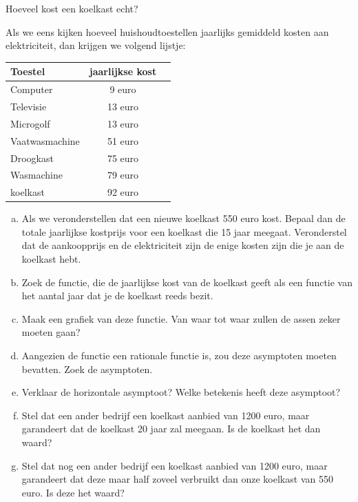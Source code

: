 \documentclass[12pt]{article}
\begin{document}
\begin{oefening}
Hoeveel kost een koelkast echt?

Als we eens kijken hoeveel huishoudtoestellen jaarlijks gemiddeld kosten aan elektriciteit, dan krijgen we volgend lijstje:
\begin{center}
  \begin{tabular}{l|cl}
  Toestel & jaarlijkse kost\\
  \hline
  Computer & 9 euro\\ 
  Televisie & 13 euro\\
  Microgolf & 13 euro\\
  Vaatwasmachine & 51 euro\\
  Droogkast & 75 euro\\
  Wasmachine & 79 euro\\
  koelkast & 92 euro\\ 
  \end{tabular}
\end{center}

\begin{enumerate}[(a)]
  \item Als we veronderstellen dat een nieuwe koelkast 550 euro kost. Bepaal dan de totale jaarlijkse kostprijs voor een koelkast die 15 jaar meegaat. Veronderstel dat de aankoopprijs en de elektriciteit zijn de enige kosten zijn die je aan de koelkast hebt.
  \item Zoek de functie, die de jaarlijkse kost van de koelkast geeft als een functie van het aantal jaar dat je de koelkast reeds bezit.
  \item Maak een grafiek van deze functie. Van waar tot waar zullen de assen zeker moeten gaan?
  \item Aangezien de functie een rationale functie is, zou deze asymptoten moeten bevatten. Zoek de asymptoten.
  \item Verklaar de horizontale asymptoot? Welke betekenis heeft deze asymptoot?
  \item Stel dat een ander bedrijf een koelkast aanbied van 1200 euro, maar garandeert dat de koelkast 20 jaar zal meegaan. Is de koelkast het dan waard?
  \item Stel dat nog een ander bedrijf een koelkast aanbied van 1200 euro, maar garandeert dat deze maar half zoveel verbruikt dan onze koelkast van 550 euro. Is deze het waard?
\end{enumerate}
\end{oefening}
\end{document}
